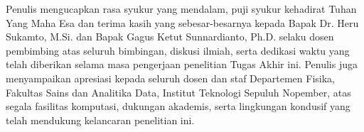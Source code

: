 Penulis mengucapkan rasa syukur yang mendalam, puji syukur kehadirat Tuhan Yang Maha Esa dan terima kasih yang sebesar-besarnya kepada Bapak Dr. Heru Sukamto, M.Si. dan Bapak Gagus Ketut Sunnardianto, Ph.D. selaku dosen pembimbing atas seluruh bimbingan, diskusi ilmiah, serta dedikasi waktu yang telah diberikan selama masa pengerjaan penelitian Tugas Akhir ini. Penulis juga menyampaikan apresiasi kepada seluruh dosen dan staf Departemen Fisika, Fakultas Sains dan Analitika Data, Institut Teknologi Sepuluh Nopember, atas segala fasilitas komputasi, dukungan akademis, serta lingkungan kondusif yang telah mendukung kelancaran penelitian ini.
